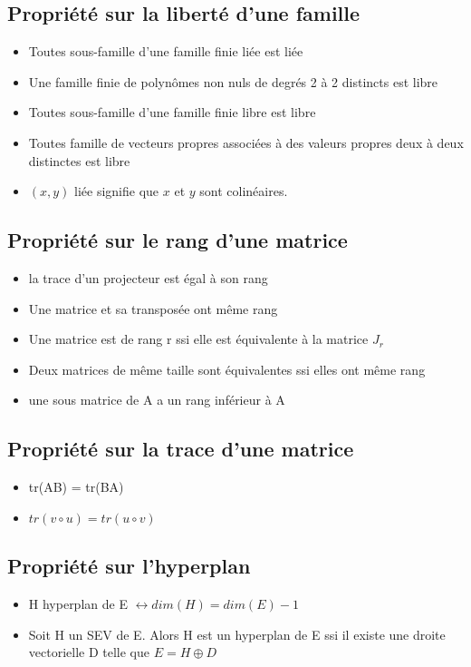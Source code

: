 \documentclass{article}
\begin{document}
\subsection{Propriété sur la liberté d'une famille}
\begin{itemize}[label=$\ast$]
	\item Toutes sous-famille d'une famille finie liée est liée
	\item Une famille finie de polynômes non nuls de degrés 2 à 2 distincts est libre
	\item Toutes sous-famille d'une famille finie libre est libre
	\item  Toutes famille de vecteurs propres associées à des valeurs propres deux à deux distinctes est libre
	\item \( (x,y) \) liée signifie que \( x \) et \( y \) sont colinéaires.
\end{itemize}

\subsection{Propriété sur le rang d'une matrice}
\begin{itemize}[label=$\ast$]
	\item la trace d'un projecteur est égal à son rang
	\item Une matrice et sa transposée ont même rang
	\item Une matrice est de rang r ssi elle est équivalente à la matrice \( J_r \)
	\item Deux matrices de même taille sont équivalentes ssi elles ont même rang
	\item une sous matrice de A a un rang inférieur à A
\end{itemize}

\subsection{Propriété sur la trace d'une matrice}
\begin{itemize}[label=$\ast$]
	\item tr(AB) = tr(BA)
	\item \(tr(v \circ u) = tr(u \circ v) \)
\end{itemize}

\subsection{Propriété sur l'hyperplan}
\begin{itemize}[label=$\ast$]
	\item H hyperplan de E \( \leftrightarrow dim(H) = dim(E)-1 \)
	\item Soit H un SEV de E. Alors H est un hyperplan de E ssi il existe une droite vectorielle D telle que \(E = H \oplus D \)
\end{itemize}
\end{document}
